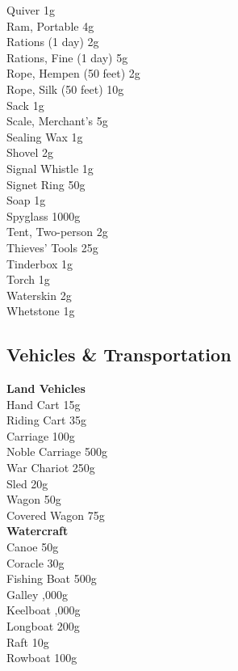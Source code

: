 \documentclass[10pt,twoside]{article}
\begin{document}
\begin{multicols}{3}
Quiver \dotfill 1g \\
Ram, Portable \dotfill 4g \\
Rations (1 day) \dotfill 2g \\
Rations, Fine (1 day) \dotfill 5g \\
Rope, Hempen (50 feet) \dotfill 2g \\
Rope, Silk (50 feet) \dotfill 10g \\
Sack \dotfill 1g \\
Scale, Merchant's \dotfill 5g \\
Sealing Wax \dotfill 1g \\
Shovel \dotfill 2g \\
Signal Whistle \dotfill 1g \\
Signet Ring \dotfill 50g \\
Soap \dotfill 1g \\
Spyglass \dotfill 1000g \\
Tent, Two-person \dotfill 2g \\
Thieves' Tools \dotfill 25g \\
Tinderbox \dotfill 1g \\
Torch \dotfill 1g \\
Waterskin \dotfill 2g \\
Whetstone \dotfill 1g \\
\end{multicols}

\subsection{Vehicles \& Transportation}

\begin{multicols}{2}
\textbf{Land Vehicles} \\
Hand Cart \dotfill 15g \\
Riding Cart \dotfill 35g \\
Carriage \dotfill 100g \\
Noble Carriage \dotfill 500g \\
War Chariot \dotfill 250g \\
Sled \dotfill 20g \\
Wagon \dotfill 50g \\
Covered Wagon \dotfill 75g \\

\textbf{Watercraft} \\
Canoe \dotfill 50g \\
Coracle \dotfill 30g \\
Fishing Boat \dotfill 500g \\
Galley ,000g \\
Keelboat ,000g \\
Longboat \dotfill 200g \\
Raft \dotfill 10g \\
Rowboat \dotfill 100g \\
\end{multicols}
\end{document}
